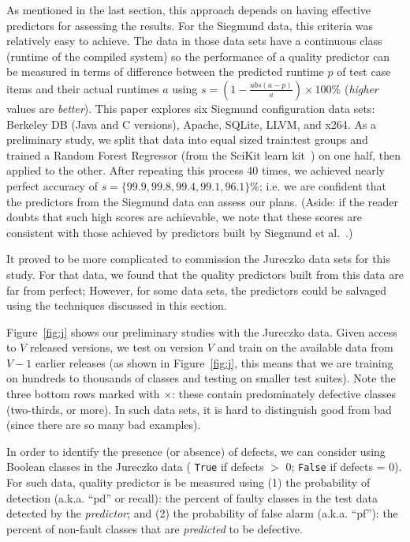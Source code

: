 \documentclass{sig-alternate}
\newcommand{\fig}[1]{Figure~\ref{fig:#1}}
\begin{document}
  As mentioned in the last section,  this approach depends on having effective predictors for assessing the results.
  For the Siegmund data, this criteria was   relatively easy to achieve.
  The data in those data sets have a continuous class (runtime of the compiled system)
  so the performance of a quality predictor can  be measured in terms of  difference between the predicted runtime $p$ of test case items and their actual runtimes $a$ using  $s= (1 - \frac{abs(a - p)}{a})\times100\%$ ({\em higher} values are {\em better}).
This paper  explores six Siegmund configuration data sets:  Berkeley DB (Java and C versions), Apache, SQLite, LLVM, and
  x264. 
  As a preliminary study, we split that data into equal sized train:test groups
  and trained a Random Forest
  Regressor (from the SciKit learn kit~\cite{Pedregosa2012})   on one half, then applied to the other. After repeating this process 40 times, we achieved nearly perfect accuracy of $s=\{99.9, 99.8, 99.4, 99.1, 96.1\}\%$;
  i.e.  we are confident that the predictors from the Siegmund data can assess
our plans. (Aside: if the reader doubts that such high scores are achievable, we note that these scores are consistent with those achieved by predictors built by Siegmund et al.~\cite{sven12}.)



 It proved to be  more complicated to commission the Jureczko data sets for this study.
 For that data, we found that the
 quality predictors built from this data are far from perfect;
However, for some data sets, the  predictors could
be salvaged using the techniques discussed in this section.

 \fig{j} shows our preliminary studies with the Jureczko   data.
Given access to $V$ released
versions, we test on version $V$ and train on the available data from $V-1$ earlier releases (as
shown in \fig{j}, this means that we are training on hundreds to thousands
of classes and testing on smaller test suites).
Note the   \colorbox{lavenderpink}{three bottom} \colorbox{lavenderpink}{rows}   marked with $\times$: these contain predominately defective classes (two-thirds, or more).  In such data sets, it is hard to distinguish good from bad (since there are so many bad examples). 


In order to identify the presence (or absence) of defects, we can consider using Boolean classes in the  Jureczko data ( \texttt{True} if defects $\gt$ 0; \texttt{False} if defects = 0).
For such data, quality predictor   is be measured using
(1) the  probability of detection (a.k.a. ``pd'' or recall):  the percent of faulty classes in
the test data detected
by the {\em predictor}; and (2) the 
probability of false alarm (a.k.a. ``pf''): the percent of non-fault
classes that are {\em predicted} to be defective.
\end{document}
